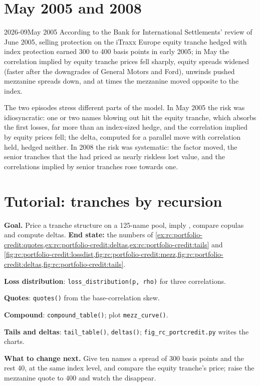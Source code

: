\section{May 2005 and 2008}

\begin{dated}{2026-09}{May 2005}\label{dat:rc:portfolio-credit:may2005}
According to the Bank for International Settlements' review of June 2005, selling
protection on the iTraxx Europe equity tranche hedged with index protection earned 300 to
400 basis points in early 2005; in May the correlation implied by equity tranche prices
fell sharply, equity spreads widened (faster after the downgrades of General Motors and
Ford), unwinds pushed mezzanine spreads down, and at times the mezzanine moved opposite
to the index.
\end{dated}

The two episodes stress different parts of the model. In May 2005 the risk was
idiosyncratic: one or two names blowing out hit the equity tranche, which absorbs the first
losses, far more than an index-sized hedge, and the correlation implied by equity prices
fell; the delta, computed for a parallel move with correlation held, hedged neither. In
2008 the risk was systematic: the factor moved, the senior tranches that the  had priced as nearly riskless lost value, and the correlations implied by senior
tranches rose towards one.

\section{Tutorial: tranches by recursion}\label{tut:rc:portfolio-credit:tutorial}

\begin{tutorial}
\textbf{Goal.} Price a tranche structure on a 125-name pool, imply , compare copulas and compute deltas. \textbf{End state:} the numbers of
\cref{ex:rc:portfolio-credit:quotes,ex:rc:portfolio-credit:deltas,ex:rc:portfolio-credit:tails} and
\cref{fig:rc:portfolio-credit:lossdist,fig:rc:portfolio-credit:mezz,fig:rc:portfolio-credit:deltas,fig:rc:portfolio-credit:tails}.
\begin{tutsteps}
\item \textbf{Loss distribution}: \texttt{loss\_distribution(p, rho)} for three
correlations.
\item \textbf{Quotes}: \texttt{quotes()} from the base-correlation skew.
\item \textbf{Compound}: \texttt{compound\_table()}; plot \texttt{mezz\_curve()}.
\item \textbf{Tails and deltas}: \texttt{tail\_table()}, \texttt{deltas()};
\texttt{fig\_rc\_portcredit.py} writes the charts.
\end{tutsteps}
\textbf{What to change next.} Give ten names a spread of 300 basis points and the rest 40,
at the same index level, and compare the equity tranche's price; raise the mezzanine
quote to 400 and watch the  disappear.
\end{tutorial}

